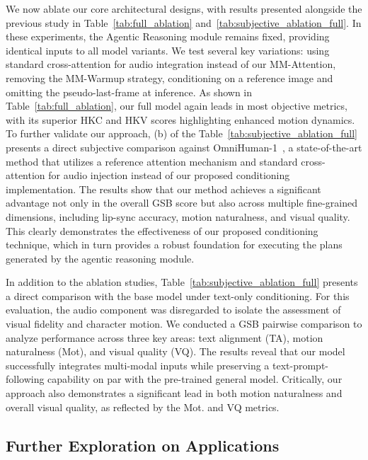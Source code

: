 We now ablate our core architectural designs, with results presented alongside the previous study in Table~\ref{tab:full_ablation} and~\ref{tab:subjective_ablation_full}. In these experiments, the Agentic Reasoning module remains fixed, providing identical inputs to all model variants. We test several key variations: using standard cross-attention for audio integration instead of our MM-Attention, removing the MM-Warmup strategy, conditioning on a reference image and omitting the pseudo-last-frame at inference.
As shown in Table~\ref{tab:full_ablation}, our full model again leads in most objective metrics, with its superior HKC and HKV scores highlighting enhanced motion dynamics. To further validate our approach, (b) of the Table~\ref{tab:subjective_ablation_full} presents a direct subjective comparison against OmniHuman-1~\cite{lin2025omnihuman}, a state-of-the-art method that utilizes a reference attention mechanism and standard cross-attention for audio injection instead of our proposed conditioning implementation. The results show that our method achieves a significant advantage not only in the overall GSB score but also across multiple fine-grained dimensions, including lip-sync accuracy, motion naturalness, and visual quality. This clearly demonstrates the effectiveness of our proposed conditioning technique, which in turn provides a robust foundation for executing the plans generated by the agentic reasoning module.


\par
In addition to the ablation studies, Table~\ref{tab:subjective_ablation_full} presents a direct comparison with the base model under text-only conditioning. For this evaluation, the audio component was disregarded to isolate the assessment of visual fidelity and character motion. We conducted a GSB pairwise comparison to analyze performance across three key areas: text alignment (TA), motion naturalness (Mot), and visual quality (VQ). The results reveal that our model successfully integrates multi-modal inputs while preserving a text-prompt-following capability on par with the pre-trained general model. Critically, our approach also demonstrates a significant lead in both motion naturalness and overall visual quality, as reflected by the Mot. and VQ metrics.

\subsection{Further Exploration on Applications}


